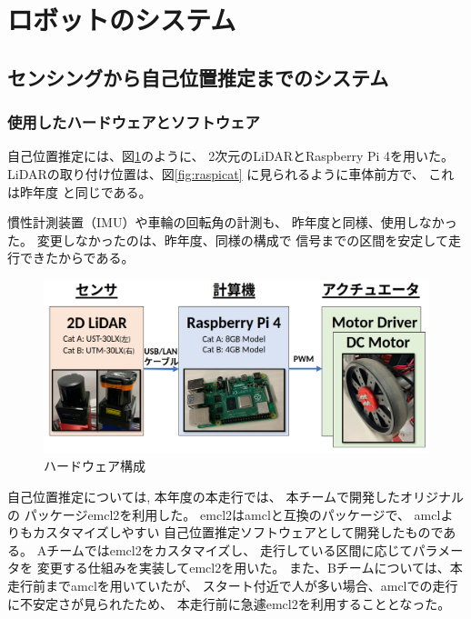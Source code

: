 \documentclass[twocolumn,9pt]{jsproceedings}
\begin{document}
\section{ロボットのシステム}

\subsection{センシングから自己位置推定までのシステム}

\subsubsection{使用したハードウェアとソフトウェア}


自己位置推定には、図\ref{fig:hardware}のように、
2次元のLiDARとRaspberry Pi 4を用いた。
LiDARの取り付け位置は、図\ref{fig:raspicat}
に見られるように車体前方で、
これは昨年度\cite{去年のつくばチャレンジシンポジウム, SI2021}
と同じである。

慣性計測装置（IMU）や車輪の回転角の計測も、
昨年度と同様、使用しなかった。
変更しなかったのは、昨年度、同様の構成で
信号までの区間を安定して走行できたからである。

\begin{figure}[h]
  \begin{center}
    \includegraphics[width=1.0\linewidth]{figs/hardware.pdf}
    \caption{ハードウェア構成}
    \label{fig:hardware}
  \end{center}
\end{figure}

自己位置推定については, 本年度の本走行では、
本チームで開発したオリジナルの
パッケージemcl2\cite{githubのemcl2}を利用した。
emcl2はamcl\cite{なにか文献}と互換のパッケージで、
amclよりもカスタマイズしやすい
自己位置推定ソフトウェアとして開発したものである。
Aチームではemcl2をカスタマイズし、
走行している区間に応じてパラメータを
変更する仕組みを実装してemcl2を用いた。
また、Bチームについては、本走行前までamclを用いていたが、
スタート付近で人が多い場合、amclでの走行に不安定さが見られたため、
本走行前に急遽emcl2を利用することとなった。
\end{document}
